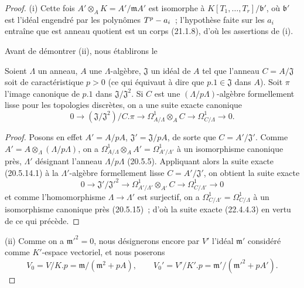 \begin{proof}
(i) Cette fois $A'\otimes_AK=A'/\mathfrak mA'$ est isomorphe à
$K[T_1,\ldots,T_r]/\mathfrak b'$, où $\mathfrak b'$ est l'idéal engendré
par les polynômes $T^p- a_i$~; l'hypothèse faite sur les $a_i$ entraîne que
est anneau quotient est un corps (21.1.8), d'où les assertions de (i).

Avant de démontrer (ii), nous établirons le

\begin{lemma}[22.4.4.2]
\label{0.22.4.4.2-fr}
Soient $\Lambda$ un anneau, $A$ une $\Lambda$-algèbre, $\mathfrak J$ un
idéal de $A$ tel que l'anneau $C=A/\mathfrak J$ soit de caractéristique
$p>0$ (ce qui équivaut à dire que $p.1\in\mathfrak J$ dans $A$). Soit
$\pi$ l'image canonique de $p.1$ dans
$\mathfrak J/\mathfrak J^2$. Si $C$ est une $(\Lambda/p\Lambda)$-algèbre
formellement lisse pour les topologies discrètes, on a une suite exacte
canonique
\begin{equation}
\label{0.22.4.4.3-fr}
  0\longrightarrow(\mathfrak J/\mathfrak J^2)/C.\pi
  \longrightarrow\Omega^1_{A/\Lambda}\otimes_AC
  \longrightarrow\Omega^1_{C/\Lambda}\longrightarrow0.
  \tag{22.4.4.3}
\end{equation}
\end{lemma}

\begin{proof}
Posons en effet $A'=A/pA$, $\mathfrak J'=\mathfrak J/pA$, de sorte que
$C=A'/\mathfrak J'$. Comme
$A'=A\otimes_\Lambda(\Lambda/p\Lambda)$, on a
$\Omega^1_{A/\Lambda}\otimes_AA'=\Omega^1_{A'/\Lambda'}$ à un
isomorphisme canonique près, $\Lambda'$ désignant l'anneau
$\Lambda/p\Lambda$ (20.5.5). Appliquant alors la suite exacte (20.5.14.1) à
la $\Lambda'$-algèbre formellement lisse $C=A'/\mathfrak J'$, on obtient la
suite exacte
\[
  0\longrightarrow\mathfrak J'/\mathfrak J'^2
  \longrightarrow\Omega^1_{A'/\Lambda'}\otimes_{A'}C
  \longrightarrow\Omega^1_{C/\Lambda'}\longrightarrow0
\]
et comme l'homomorphisme $\Lambda\to\Lambda'$ est surjectif, on a
$\Omega^1_{C/\Lambda'}=\Omega^1_{C/\Lambda}$ à un isomorphisme canonique
près (20.5.15)~; d'où la suite exacte (22.4.4.3) en vertu de ce qui précède.
\end{proof}

(ii) Comme on a $\mathfrak m'^2=0$, nous désignerons encore par $V'$ l'idéal
$\mathfrak m'$ considéré comme $K'$-espace vectoriel, et nous poserons
\begin{equation}
\label{0.22.4.4.4-fr}
  V_0=V/K.p=\mathfrak m/(\mathfrak m^2+pA),\qquad
  V_0'=V'/K'.p=\mathfrak m'/(\mathfrak m'^2+pA').
  \tag{22.4.4.4}
\end{equation}


\end{proof}
